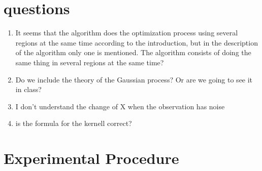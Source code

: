 \documentclass{article}
\begin{document}
\section{questions}

\begin{enumerate}
    \item It seems that the algorithm does the optimization process using several regions at the same time according to the introduction, but in the description of the algorithm only one is mentioned. The algorithm consists of doing the same thing in several regions at the same time?
    \item Do we include the theory of the Gaussian process? Or are we going to see it in class?
    \item  I don't understand the change of X when the observation has noise
    \item is the formula for the kernell
    correct?

\end{enumerate}

\section{Experimental Procedure}

\maketitle
\end{document}
